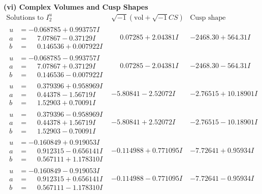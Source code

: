 \documentclass[1p]{elsarticle_modified}
\theoremstyle{definition}
\newcommand{\I}{\sqrt{-1}}
\begin{document}
\newpage\flushleft \textbf{(vi) Complex Volumes and Cusp Shapes}
$$\begin{array}{c|c|c}  
\text{Solutions to }I^u_{2}& \I (\text{vol} + \sqrt{-1}CS) & \text{Cusp shape}\\
 \hline 
\begin{aligned}
u &= -0.068785 + 0.993757 I \\
a &= \phantom{-}7.07867 - 0.37129 I \\
b &= \phantom{-}0.146536 + 0.007922 I\end{aligned}
 & \phantom{-}0.07285 + 2.04381 I & -2468.30 + 564.31 I \\ \hline\begin{aligned}
u &= -0.068785 - 0.993757 I \\
a &= \phantom{-}7.07867 + 0.37129 I \\
b &= \phantom{-}0.146536 - 0.007922 I\end{aligned}
 & \phantom{-}0.07285 - 2.04381 I & -2468.30 - 564.31 I \\ \hline\begin{aligned}
u &= \phantom{-}0.379396 + 0.958969 I \\
a &= \phantom{-}0.44378 - 1.56719 I \\
b &= \phantom{-}1.52903 + 0.70091 I\end{aligned}
 & -5.80841 - 2.52072 I & -2.76515 + 10.18901 I \\ \hline\begin{aligned}
u &= \phantom{-}0.379396 - 0.958969 I \\
a &= \phantom{-}0.44378 + 1.56719 I \\
b &= \phantom{-}1.52903 - 0.70091 I\end{aligned}
 & -5.80841 + 2.52072 I & -2.76515 - 10.18901 I \\ \hline\begin{aligned}
u &= -0.160849 + 0.919053 I \\
a &= \phantom{-}0.912315 - 0.656141 I \\
b &= \phantom{-}0.567111 + 1.178310 I\end{aligned}
 & -0.114988 + 0.771095 I & -7.72641 + 0.95934 I \\ \hline\begin{aligned}
u &= -0.160849 - 0.919053 I \\
a &= \phantom{-}0.912315 + 0.656141 I \\
b &= \phantom{-}0.567111 - 1.178310 I\end{aligned}
 & -0.114988 - 0.771095 I & -7.72641 - 0.95934 I \\ \hline\begin{aligned}

\end{aligned}
\end{array}$$
\end{document}
